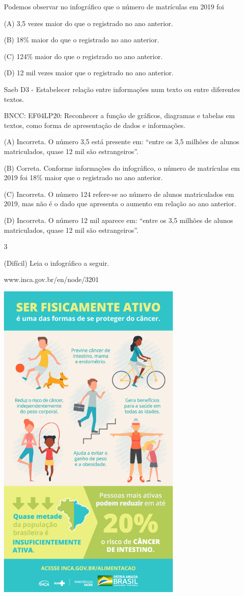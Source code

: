 \begin{itemize}
{{{\begin{itemize}
\begin{itemize}
\begin{itemize}
Podemos observar no infográfico que o número de matrículas em 2019 foi

(A) 3,5 vezes maior do que o registrado no ano anterior.

(B) 18\% maior do que o registrado no ano anterior.

(C) 124\% maior do que o registrado no ano anterior.

(D) 12 mil vezes maior que o registrado no ano anterior.

Saeb D3 - Estabelecer relação entre informações num texto ou entre
diferentes textos.

BNCC: EF04LP20: Reconhecer a função de gráficos, diagramas e tabelas em
textos, como forma de apresentação de dados e informações.

(A) Incorreta. O número 3,5 está presente em: ``entre os 3,5 milhões de
alunos matriculados, quase 12 mil são estrangeiros''.

(B) Correta. Conforme informações do infográfico, o número de matrículas
em 2019 foi 18\% maior que o registrado no ano anterior.

(C) Incorreta. O número 124 refere-se ao número de alunos matriculados
em 2019, mas não é o dado que apresenta o aumento em relação ao ano
anterior.

(D) Incorreta. O número 12 mil aparece em: ``entre os 3,5 milhões de
alunos matriculados, quase 12 mil são estrangeiros''.

\num{3}

(Difícil) Leia o infográfico a seguir.

www.inca.gov.br/en/node/3201

\includegraphics[width=3.58333in,height=6.36458in]{media/image34.jpeg}


\end{itemize}
\end{itemize}
\end{itemize}}}}
\end{itemize}
